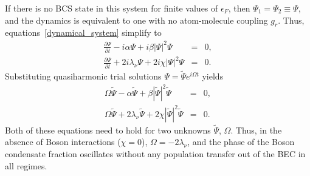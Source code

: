 \documentclass[a4paper,10pt]{article}
\begin{document}
If there is no BCS state in this system for finite values of $\epsilon_F$, then $\Psi_1 = \Psi_2 \equiv \Psi$, and the dynamics is equivalent to one with no atom-molecule coupling $g_r$. Thus, equations~\ref{dynamical_system} simplify to
\begin{eqnarray}
\label{dynamical_system_nogr}
\frac{\partial\Psi}{\partial t} - i\alpha \Psi +i\beta |\Psi|^2 \Psi &=& 0, \nonumber \\
\frac{\partial\Psi}{\partial t} +2 i \lambda_\nu \Psi +2 i\chi|\Psi|^2\Psi &=& 0.
\end{eqnarray}
Substituting quasiharmonic trial solutions $\Psi = \tilde{\Psi} e^{i\Omega t}$ yields
\begin{eqnarray}
\label{dynamical_system_nogr_ft}
\Omega \tilde{\Psi} - \alpha \tilde{\Psi} +\beta |\tilde{\Psi}|^2 \tilde{\Psi} &=& 0, \nonumber \\
\Omega\tilde{\Psi} +2  \lambda_\nu \tilde{\Psi} +2 \chi|\tilde{\Psi}|^2\tilde{\Psi} &=& 0.
\end{eqnarray}
Both of these equations need to hold for two unknowns $\tilde{\Psi}$, $\Omega$. Thus, in the absence of Boson interactions ($\chi = 0$), $\Omega=- 2 \lambda_\nu$, and the phase of the Boson condensate fraction oscillates without any population transfer out of the BEC in all regimes.
\end{document}

